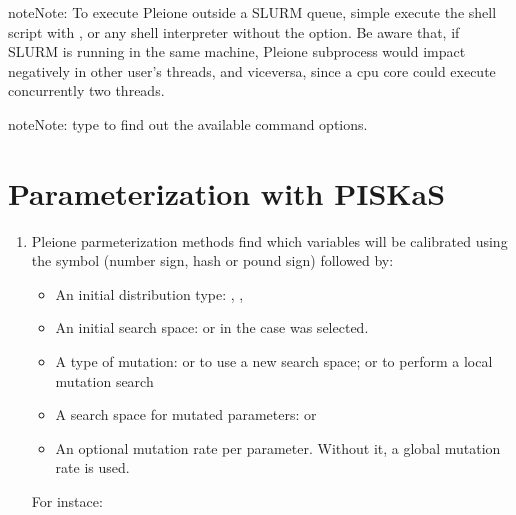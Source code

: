 \documentclass[letterpaper,10pt,english]{sphinxmanual}
\begin{document}
\begin{sphinxadmonition}{note}{Note:}
 To execute Pleione outside a SLURM
queue, simple execute the shell script with ,  or any shell
interpreter without the  option. Be aware that, if SLURM is
running in the same machine, Pleione subprocess would impact negatively in
other user’s threads, and viceversa, since a cpu core could execute
concurrently two threads.
\end{sphinxadmonition}

\begin{sphinxadmonition}{note}{Note:}
 type  to find out the
available command options.
\end{sphinxadmonition}


\section{Parameterization with PISKaS}
\label{\detokenize{engines/piskas:parameterization-with-piskas}}\label{\detokenize{engines/piskas::doc}}\begin{enumerate}
\def\theenumi{\arabic{enumi}}
\def\labelenumi{\theenumi .}
\makeatletter\def\p@enumii{\p@enumi \theenumi .}\makeatother
\item {} 

Pleione parmeterization methods find which variables will be calibrated using
the symbol \sphinxcode{\sphinxupquote{\#}} (number sign, hash or pound sign) followed by:
\begin{itemize}
\item {} 
An initial distribution type: , , 

\item {} 
An initial search space:  or 
in the case  was selected.

\item {} 
A type of mutation:  or  to use a new search
space; or  to perform a local mutation search

\item {} 
A search space for mutated parameters:  or

\item {} 
An optional mutation rate per parameter. Without it, a global mutation
rate is used.

\end{itemize}

For instace:

\end{enumerate}
\end{document}
